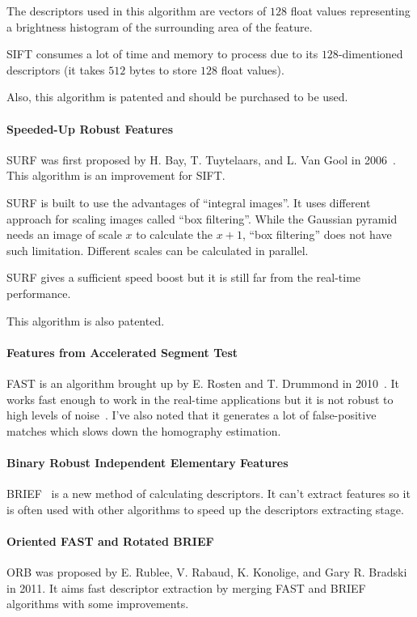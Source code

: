 \documentclass[12pt]{article}
\begin{document}
    The descriptors used in this algorithm are vectors of $128$ float values
    representing a brightness histogram of the surrounding area of the feature.

    SIFT consumes a lot of time and memory to process
    due to its $128$-dimentioned descriptors (it takes $512$ bytes
    to store $128$ float values).

    Also, this algorithm is patented and should be purchased to be used.

    \paragraph{Speeded-Up Robust Features}
    SURF was first proposed by H. Bay, T. Tuytelaars, and L. Van Gool
    in 2006~\cite{SURF, pySURF}. This algorithm is an improvement for SIFT.

    SURF is built to use the advantages of ``integral images''.
    It uses different approach for scaling images called ``box filtering''.
    While the Gaussian pyramid needs an image of scale $x$ to calculate the $x+1$,
    ``box filtering'' does not have such limitation.
    Different scales can be calculated in parallel.

    SURF gives a sufficient speed boost but it is still far from the real-time
    performance.

    This algorithm is also patented.

    \paragraph{Features from Accelerated Segment Test}
    FAST is an algorithm brought up by E. Rosten and
    T. Drummond in 2010~\cite{FAST}. It works fast enough to work in
    the real-time applications but it is not robust
    to high levels of noise~\cite{pyFAST}. I've also noted that it generates
    a lot of false-positive matches which slows down the homography estimation.

    \paragraph{Binary Robust Independent Elementary Features}
    BRIEF~\cite{pyBRIEF} is a new method of calculating descriptors.
    It can't extract features so it is often used with other algorithms
    to speed up the descriptors extracting stage.

    \paragraph{Oriented FAST and Rotated BRIEF}
    ORB was proposed by E. Rublee, V. Rabaud, K. Konolige, and Gary R. Bradski
    in 2011. It aims fast descriptor extraction by merging FAST and BRIEF
    algorithms with some improvements.
\end{document}
